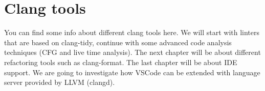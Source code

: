 \part{Clang tools}
You can find some info about different clang tools here. We will start with
linters that are based on clang-tidy, continue with some advanced code analysis
techniques (CFG and live time analysis). The next chapter will be about
different refactoring tools such as clang-format. The last chapter will be about
IDE support. We are going to investigate how VSCode can be extended with
language server provided by LLVM (clangd).





